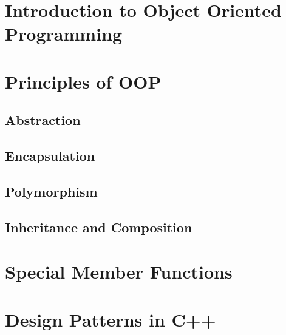 \documentclass{article}
\title{}
\author{Ryan Baker}
\date{\today}
\begin{document}
\maketitle
\tableofcontents
\pagebreak

\section{Introduction to Object Oriented Programming}



\section{Principles of OOP}

\subsection{Abstraction}

\subsection{Encapsulation}

\subsection{Polymorphism}

\subsection{Inheritance and Composition}

\section{Special Member Functions}

\section{Design Patterns in C++}
\end{document}
